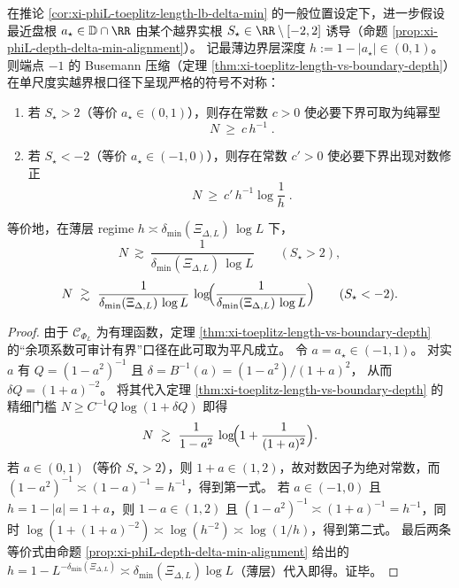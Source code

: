 \begin{corollary}\label{cor:xi-phiL-endpoint-asymmetry-log-correction}
在推论 \ref{cor:xi-phiL-toeplitz-length-lb-delta-min} 的一般位置设定下，进一步假设最近盘根 \(a_\star\in\mathbb{D}\cap\RR\) 由某个越界实根 \(S_\star\in\RR\setminus[-2,2]\) 诱导（命题 \ref{prop:xi-phiL-depth-delta-min-alignment}）。
记最薄边界层深度 \(h:=1-|a_\star|\in(0,1)\)。
则端点 \(-1\) 的 Busemann 压缩（定理 \ref{thm:xi-toeplitz-length-vs-boundary-depth}）在单尺度实越界根口径下呈现严格的符号不对称：
\begin{enumerate}
  \item 若 \(S_\star>2\)（等价 \(a_\star\in(0,1)\)），则存在常数 \(c>0\) 使必要下界可取为纯幂型
  \[
  \boxed{\;
  N\ \ge\ c\,h^{-1}\; }.
  \]
  \item 若 \(S_\star<-2\)（等价 \(a_\star\in(-1,0)\)），则存在常数 \(c'>0\) 使必要下界出现对数修正
  \[
  \boxed{\;
  N\ \ge\ c'\,h^{-1}\log\frac{1}{h}\; }.
  \]
\end{enumerate}
等价地，在薄层 regime \(h\asymp \delta_{\min}(\Xi_{\Delta,L})\,\log L\) 下，
\[
N\ \gtrsim\ \frac{1}{\delta_{\min}(\Xi_{\Delta,L})\,\log L}\qquad(S_\star>2),
\]
\[
N\ \gtrsim\ \frac{1}{\delta_{\min}(\Xi_{\Delta,L})\,\log L}\,
\log\!\Bigl(\frac{1}{\delta_{\min}(\Xi_{\Delta,L})\,\log L}\Bigr)\qquad(S_\star<-2).
\]
\end{corollary}

\begin{proof}
由于 \(\mathscr{C}_{\Phi_L}\) 为有理函数，定理 \ref{thm:xi-toeplitz-length-vs-boundary-depth} 的“余项系数可审计有界”口径在此可取为平凡成立。
令 \(a=a_\star\in(-1,1)\)。
对实 \(a\) 有 \(Q=(1-a^2)^{-1}\) 且
\(
\delta=B^{-1}(a)=(1-a^2)/(1+a)^2
\)，
从而 \(\delta Q=(1+a)^{-2}\)。
将其代入定理 \ref{thm:xi-toeplitz-length-vs-boundary-depth} 的精细门槛
\(
N\ge C^{-1}Q\log(1+\delta Q)
\)
即得
\[
N\ \gtrsim\ \frac{1}{1-a^2}\,
\log\!\Bigl(1+\frac{1}{(1+a)^2}\Bigr).
\]
若 \(a\in(0,1)\)（等价 \(S_\star>2\)），则 \(1+a\in(1,2)\)，故对数因子为绝对常数，而 \((1-a^2)^{-1}\asymp (1-a)^{-1}=h^{-1}\)，得到第一式。
若 \(a\in(-1,0)\) 且 \(h=1-|a|=1+a\)，则 \(1-a\in(1,2)\) 且 \((1-a^2)^{-1}\asymp (1+a)^{-1}=h^{-1}\)，同时 \(\log(1+(1+a)^{-2})\asymp \log(h^{-2})\asymp \log(1/h)\)，得到第二式。
最后两条等价式由命题 \ref{prop:xi-phiL-depth-delta-min-alignment} 给出的 \(h=1-L^{-\delta_{\min}(\Xi_{\Delta,L})}\asymp \delta_{\min}(\Xi_{\Delta,L})\log L\)（薄层）代入即得。证毕。
\end{proof}

